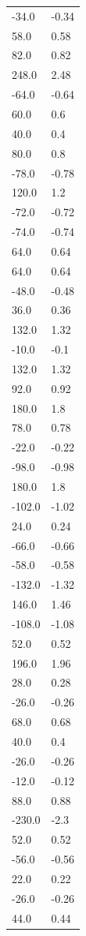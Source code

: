 \begin{longtable}{ll}
-34.0 & -0.34 \\
58.0 & 0.58 \\
82.0 & 0.82 \\
248.0 & 2.48 \\
-64.0 & -0.64 \\
60.0 & 0.6 \\
40.0 & 0.4 \\
80.0 & 0.8 \\
-78.0 & -0.78 \\
120.0 & 1.2 \\
-72.0 & -0.72 \\
-74.0 & -0.74 \\
64.0 & 0.64 \\
64.0 & 0.64 \\
-48.0 & -0.48 \\
36.0 & 0.36 \\
132.0 & 1.32 \\
-10.0 & -0.1 \\
132.0 & 1.32 \\
92.0 & 0.92 \\
180.0 & 1.8 \\
78.0 & 0.78 \\
-22.0 & -0.22 \\
-98.0 & -0.98 \\
180.0 & 1.8 \\
-102.0 & -1.02 \\
24.0 & 0.24 \\
-66.0 & -0.66 \\
-58.0 & -0.58 \\
-132.0 & -1.32 \\
146.0 & 1.46 \\
-108.0 & -1.08 \\
52.0 & 0.52 \\
196.0 & 1.96 \\
28.0 & 0.28 \\
-26.0 & -0.26 \\
68.0 & 0.68 \\
40.0 & 0.4 \\
-26.0 & -0.26 \\
-12.0 & -0.12 \\
88.0 & 0.88 \\
-230.0 & -2.3 \\
52.0 & 0.52 \\
-56.0 & -0.56 \\
22.0 & 0.22 \\
-26.0 & -0.26 \\
44.0 & 0.44 \\

\end{longtable}
